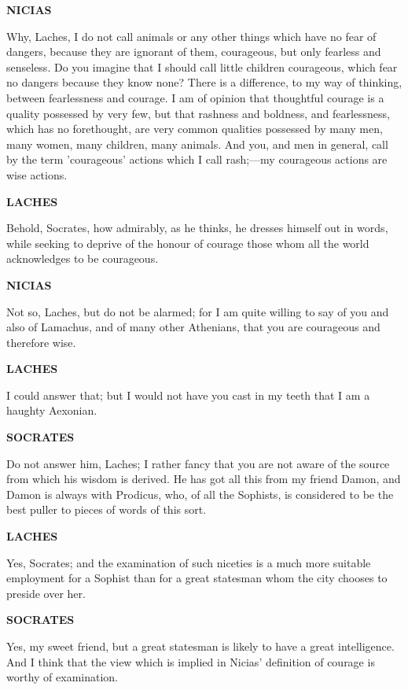 \documentclass[11pt,letter]{article}
\begin{document}
\par \textbf{NICIAS}
\par   Why, Laches, I do not call animals or any other things which have no fear of dangers, because they are ignorant of them, courageous, but only fearless and senseless. Do you imagine that I should call little children courageous, which fear no dangers because they know none? There is a difference, to my way of thinking, between fearlessness and courage. I am of opinion that thoughtful courage is a quality possessed by very few, but that rashness and boldness, and fearlessness, which has no forethought, are very common qualities possessed by many men, many women, many children, many animals. And you, and men in general, call by the term 'courageous' actions which I call rash;—my courageous actions are wise actions.

\par \textbf{LACHES}
\par   Behold, Socrates, how admirably, as he thinks, he dresses himself out in words, while seeking to deprive of the honour of courage those whom all the world acknowledges to be courageous.

\par \textbf{NICIAS}
\par   Not so, Laches, but do not be alarmed; for I am quite willing to say of you and also of Lamachus, and of many other Athenians, that you are courageous and therefore wise.

\par \textbf{LACHES}
\par   I could answer that; but I would not have you cast in my teeth that I am a haughty Aexonian.

\par \textbf{SOCRATES}
\par   Do not answer him, Laches; I rather fancy that you are not aware of the source from which his wisdom is derived. He has got all this from my friend Damon, and Damon is always with Prodicus, who, of all the Sophists, is considered to be the best puller to pieces of words of this sort.

\par \textbf{LACHES}
\par   Yes, Socrates; and the examination of such niceties is a much more suitable employment for a Sophist than for a great statesman whom the city chooses to preside over her.

\par \textbf{SOCRATES}
\par   Yes, my sweet friend, but a great statesman is likely to have a great intelligence. And I think that the view which is implied in Nicias' definition of courage is worthy of examination.
\end{document}
